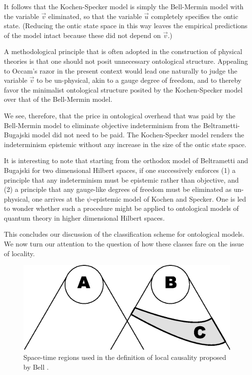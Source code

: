 \documentclass[aps,nofootinbib,12pt]{revtex4}
\begin{document}
It follows that the Kochen-Specker model is simply the Bell-Mermin
model with the variable $\vec{v}$ eliminated, so that the variable
$\vec{u}$ completely specifies the ontic state. (Reducing the ontic
state space in this way leaves the empirical predictions of the
model intact because these did not depend on $\vec{v}$.)

A methodological principle that is often adopted in the construction
of physical theories is that one should not posit unnecessary
ontological structure. Appealing to Occam's razor in the present
context would lead one naturally to judge the variable $\vec{v}$ to
be un-physical, akin to a gauge degree of freedom, and to thereby
favor the minimalist ontological structure posited by the
Kochen-Specker model over that of the Bell-Mermin model.

We see, therefore, that the price in ontological overhead that was
paid by the Bell-Mermin model to eliminate objective indeterminism
from the Beltrametti-Bugajski model did not need to be paid. The
Kochen-Specker model renders the indeterminism epistemic without any
increase in the size of the ontic state space.

It is interesting to note that starting from the orthodox model of
Beltrametti and Bugajski for two dimensional Hilbert spaces, if one
successively enforces (1) a principle that any indeterminism must be
epistemic rather than objective, and (2) a principle that any
gauge-like degrees of freedom must be eliminated as un-physical, one
arrives at the $\psi$-epistemic model of Kochen and Specker. One is
led to wonder whether such a procedure might be applied to
ontological models of quantum theory in higher dimensional Hilbert
spaces.

This concludes our discussion of the classification scheme for
ontological models. We now turn our attention to the question of how
these classes fare on the issue of locality.


\begin{figure}[t]
\includegraphics[scale=0.6]{bell_fig}\caption{Space-time regions used in the definition of local causality proposed by Bell \cite{Bell_cuisine}.}
\label{FIG:bell_fig}
\end{figure}
\end{document}
